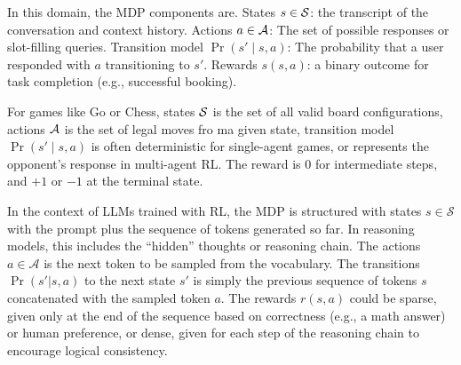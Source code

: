 \begin{example} 
In this domain, the MDP components are.
States $s \in \mathcal{S}$: the transcript of the conversation and context history.
Actions $a \in \mathcal{A}$: The set of possible responses or slot-filling queries.
Transition model $\Pr(s' \mid s, a)$: The probability that a user responded with $a$ transitioning to $s'$.
Rewards $s(s, a)$: a binary outcome for task completion (e.g., successful booking).
\end{example}

\begin{example}
For games like Go or Chess,
states $\mathcal{S}$ is the set of all valid board configurations,
actions $\mathcal{A}$ is the set of legal moves fro ma given state,
transition model $\Pr(s' \mid s, a)$ is often deterministic for single-agent games, or represents the opponent's response in multi-agent RL.
The reward is $0$ for intermediate steps, and $+1$ or $-1$ at the terminal state.
\end{example}

\begin{example}\label{ex_rl_reasoning}
In the context of LLMs trained with RL, the MDP is structured with {states} $s \in \mathcal{S}$ with the prompt plus the sequence of tokens generated so far.
In reasoning models, this includes the ``hidden'' thoughts or reasoning chain.
The {actions} $a \in \mathcal{A}$ is the next token to be sampled from the vocabulary.
The {transitions} $\Pr(s' | s, a)$ to the next state $s'$ is simply the previous sequence of tokens $s$ concatenated with the sampled token $a$.
The {rewards} $r(s, a)$ could be {sparse,} given only at the end of the sequence based on correctness (e.g., a math answer) or human preference, or {dense,} given for each step of the reasoning chain to encourage logical consistency.
\end{example}

